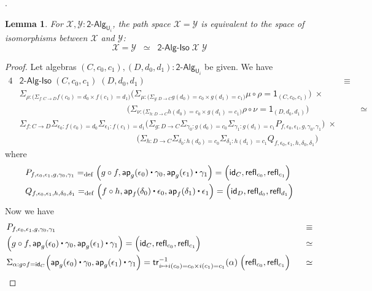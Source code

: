 \documentclass[reqno,10pt,a4paper,oneside]{amsart}
\newcommand{\X}{\mathcal{X}}
\newcommand{\Y}{\mathcal{Y}}
\newcommand{\comp}{\circ}
\newcommand{\idfun}[1]{\mathsf{id}_{#1}}
\newcommand{\sm}[1]{\Sigma_{#1}}
\newcommand{\defeq}{=_{\mathrm{def}}}
\newcommand{\refl}{\mathsf{refl}}
\newcommand{\one}{\mathsf{1}}
\newcommand{\UU}{\mathsf{U}}
\newcommand{\BoolAlg}{\mathsf{2}\text{-}\mathsf{Alg}}
\newcommand{\app}{\mathsf{ap}}
\newcommand{\trans}{\mathsf{tr}}
\newcommand{\BoolAlgIso}{\mathsf{2}\text{-}\mathsf{Alg}\text{-}\mathsf{Iso}}
\newcommand{\ct}{%
  \mathchoice{\mathbin{\raisebox{0.5ex}{$\displaystyle\centerdot$}}}%
             {\mathbin{\raisebox{0.5ex}{$\centerdot$}}}%
             {\mathbin{\raisebox{0.25ex}{$\scriptstyle\,\centerdot\,$}}}%
             {\mathbin{\raisebox{0.1ex}{$\scriptscriptstyle\,\centerdot\,$}}}}
\numberwithin{equation}{section}
\theoremstyle{mythm}
\newtheorem{lemma}[theorem]{Lemma}
\theoremstyle{mydef}
\theoremstyle{myrmk}
\begin{document}
.


\begin{lemma}\label{BoolAlgSpace}
For $\X,\Y : \BoolAlg_{\UU_i}$, the path space $\X = \Y$ is equivalent to the space of isomorphisms between $\X$ and $\Y$:
\[ \X = \Y \;\; \simeq \;\; \BoolAlgIso \; \X \; \Y \] 
\end{lemma}
\begin{proof}
Let algebras $(C,c_0,c_1), (D,d_0,d_1) : \BoolAlg_{\UU_i}$ be given. We have
\begin{alignat*}{4}
& \BoolAlgIso \; (C,c_0,c_1) \; (D,d_0,d_1) & \equiv \\
& \sm{\rho : \big(\sm{f:C\to D} f(c_0) =d_0 \times f(c_1) = d_1\big)} \Big(\sm{\mu : \big(\sm{g:D\to C} g(d_0)=c_0 \times g(d_1)=c_1\big)} \mu \comp \rho = \one_{(C,c_0,c_1)} \Big)\; \times & \\
& \;\;\;\;\;\;\;\;\;\;\;\;\;\;\;\;\;\;\;\;\;\;\;\;\;\;\;\;\;\;\;\;\;\;\;\;\;\;\;\;\;\;\;\;\;\Big(\sm{\nu : \big(\sm{h:D\to C} h(d_0)=c_0 \times g(d_1)=c_1\big)} \rho \comp \nu = \one_{(D,d_0,d_1)}\Big) & \;\;\;\;\;\;\; \simeq \\
& \sm{f : C\to D} \sm{\epsilon_0 : f(c_0)=d_0} \sm{\epsilon_1 : f(c_1) = d_1} \Big(\sm{g:D\to C} \sm{\gamma_0 : g(d_0)=c_0} \sm{\gamma_1 : g(d_1) = c_1} P_{f,\epsilon_0,\epsilon_1,g,\gamma_0,\gamma_1}\Big) \; \times & \\
& \;\;\;\;\;\;\;\;\;\;\;\;\;\;\;\;\;\;\;\;\;\;\;\;\;\;\;\;\;\;\;\;\;\;\;\;\;\;\;\;\;\;\;\;\;\;\;\;\; \Big(\sm{h:D\to C} \sm{\delta_0 : h(d_0)=c_0} \sm{\delta_1 : h(d_1) = c_1} Q_{f,\epsilon_0,\epsilon_1,h,\delta_0,\delta_1} \Big) &
\end{alignat*}
where
\begin{align*}
& P_{f,\epsilon_0,\epsilon_1,g,\gamma_0,\gamma_1} \defeq \Big(g \comp f, \app_g(\epsilon_0) \ct \gamma_0, \app_g(\epsilon_1) \ct \gamma_1\Big) = \Big(\idfun{C}, \refl_{c_0}, \refl_{c_1}\Big) \\
& Q_{f,\epsilon_0,\epsilon_1,h,\delta_0,\delta_1} \defeq \Big(f \comp h, \app_f(\delta_0) \ct \epsilon_0, \app_f(\delta_1) \ct \epsilon_1\Big) = \Big(\idfun{D}, \refl_{d_0}, \refl_{d_1}\Big)
\end{align*}
Now we have
\begin{alignat*}{4}
& P_{f,\epsilon_0,\epsilon_1,g,\gamma_0,\gamma_1} & \equiv \\
& \Big(g \comp f, \app_g(\epsilon_0) \ct \gamma_0, \app_g(\epsilon_1) \ct \gamma_1\Big) = \Big(\idfun{C}, \refl_{c_0}, \refl_{c_1}\Big) & \simeq \\
& \sm{\alpha : g \comp f = \idfun{C}} \Big(\app_g(\epsilon_0) \ct \gamma_0, \app_g(\epsilon_1) \ct \gamma_1\Big) = \trans^{-1}_{i \mapsto i(c_0) = c_0 \times i(c_1) = c_1}(\alpha) \; \Big(\refl_{c_0}, \refl_{c_1}\Big) & \;\;\; \simeq \\

\end{alignat*}
\end{proof}
\end{document}
